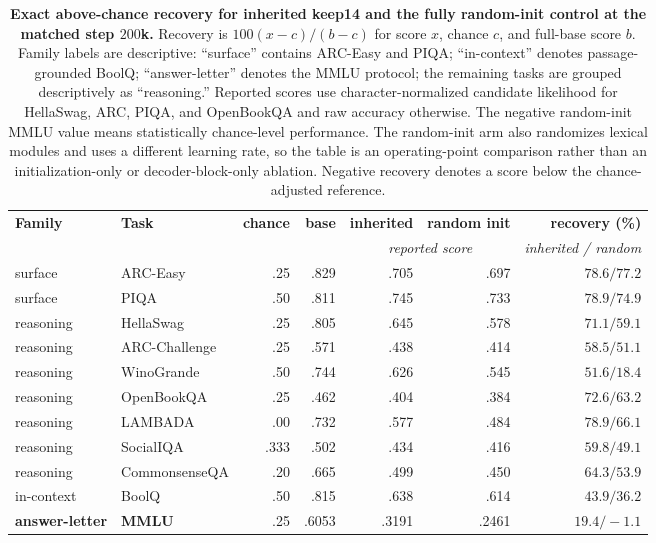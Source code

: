 \begin{table}[t]
\centering
\small
\setlength{\tabcolsep}{4.5pt}
\begin{tabular}{@{}llrrrrr@{}}
\toprule
\textbf{Family} & \textbf{Task} & \textbf{chance} & \textbf{base} &
\textbf{inherited} & \textbf{random init} & \textbf{recovery (\%)} \\
& & & & \multicolumn{2}{c}{\textit{reported score}} &
\textit{inherited / random} \\
\midrule
surface & ARC-Easy & .25 & .829 & .705 & .697 & $78.6 / 77.2$ \\
surface & PIQA & .50 & .811 & .745 & .733 & $78.9 / 74.9$ \\
\midrule
reasoning & HellaSwag & .25 & .805 & .645 & .578 & $71.1 / 59.1$ \\
reasoning & ARC-Challenge & .25 & .571 & .438 & .414 & $58.5 / 51.1$ \\
reasoning & WinoGrande & .50 & .744 & .626 & .545 & $51.6 / 18.4$ \\
reasoning & OpenBookQA & .25 & .462 & .404 & .384 & $72.6 / 63.2$ \\
reasoning & LAMBADA & .00 & .732 & .577 & .484 & $78.9 / 66.1$ \\
reasoning & SocialIQA & .333 & .502 & .434 & .416 & $59.8 / 49.1$ \\
reasoning & CommonsenseQA & .20 & .665 & .499 & .450 & $64.3 / 53.9$ \\
\midrule
in-context & BoolQ & .50 & .815 & .638 & .614 & $43.9 / 36.2$ \\
\textbf{answer-letter} & \textbf{MMLU} & .25 & .6053 & .3191 & .2461 &
$\mathbf{19.4 / -1.1}$ \\
\bottomrule
\end{tabular}
\caption{\textbf{Exact above-chance recovery for inherited keep14 and the
fully random-init control at the matched step $200$k.}
Recovery is $100(x-c)/(b-c)$ for score $x$, chance $c$, and full-base score
$b$. Family labels are descriptive: ``surface'' contains ARC-Easy and PIQA;
``in-context'' denotes passage-grounded BoolQ; ``answer-letter'' denotes the
MMLU protocol; the remaining tasks are grouped descriptively as ``reasoning.'' Reported scores use character-normalized candidate likelihood for
HellaSwag, ARC, PIQA, and OpenBookQA and raw accuracy otherwise. The negative
random-init MMLU value means statistically chance-level performance. The random-init arm also randomizes lexical modules and uses a different learning
rate, so the table is an operating-point comparison rather than an
initialization-only or decoder-block-only ablation. Negative recovery denotes a
score below the chance-adjusted reference.}
\label{tab:app-recovery}
\end{table}
